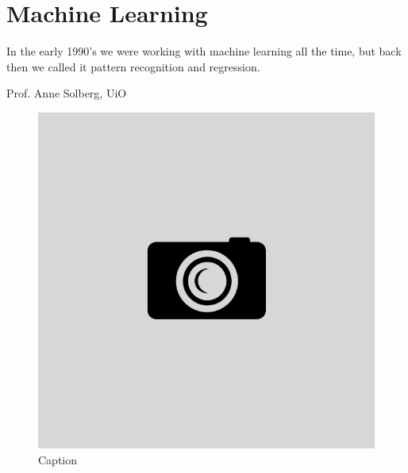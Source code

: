 \chapter{Machine Learning} \label{chp:machinelearning}
\epigraph{In the early 1990's we were working with machine learning all the time, but back then we called it pattern recognition and regression.}{Prof. Anne Solberg, UiO}
\begin{figure}[H]
	\centering
	\includegraphics[scale=0.4]{Images/example.png}
	\caption{Caption}
\end{figure}

